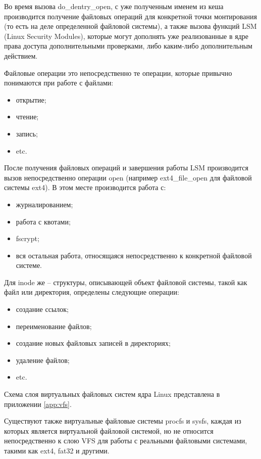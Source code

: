 \documentclass{gost7.32-2001}
\begin{document}
Во время вызова do\_dentry\_open, с уже полученным именем из кеша
производится получение файловых операций для конкретной точки
монтирования (то есть на деле определенной файловой системы), а также
вызова функций LSM (Linux Security Modules), которые могут дополнять
уже реализованные в ядре права доступа дополнительными проверками,
либо каким-либо дополнительным действием.

Файловые операции это непосредственно те операции, которые привычно
понимаются при работе с файлами:

\begin{itemize}
\item
  открытие;
\item
  чтение;
\item
  запись;
\item
  etc.
\end{itemize}

После получения файловых операций и завершения работы LSM производится
вызов непосредственно операции open (например ext4\_file\_open для
файловой системы ext4). В этом месте производится работа с:

\begin{itemize}
\item
  журналированием;
\item
  работа с квотами;
\item
  fscrypt;
\item
  вся остальная работа, относящаяся непосредственно к конкретной
  файловой системе.
\end{itemize}

Для inode же – структуры, описывающей объект файловой системы, такой
как файл или директория, определены следующие операции:

\begin{itemize}
\item
  создание ссылок;
\item
  переименование файлов;
\item
  создание новых файловых записей в директориях;
\item
  удаление файлов;
\item
  etc.
\end{itemize}

Схема слоя виртуальных файловых систем ядра Linux представлена в
приложении \ref{app:vfs}.


Существуют также виртуальные файловые системы procfs и sysfs, каждая
из которых является виртуальной файловой системой, но не относится
непосредственно к слою VFS для работы с реальными файловыми системами,
такими как ext4, fat32 и другими.
\end{document}
